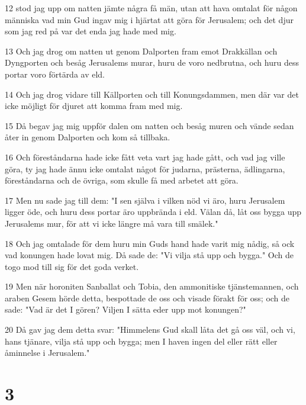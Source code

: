 \par 12 stod jag upp om natten jämte några få män, utan att hava omtalat för någon människa vad min Gud ingav mig i hjärtat att göra för Jerusalem; och det djur som jag red på var det enda jag hade med mig.
\par 13 Och jag drog om natten ut genom Dalporten fram emot Drakkällan och Dyngporten och besåg Jerusalems murar, huru de voro nedbrutna, och huru dess portar voro förtärda av eld.
\par 14 Och jag drog vidare till Källporten och till Konungsdammen, men där var det icke möjligt för djuret att komma fram med mig.
\par 15 Då begav jag mig uppför dalen om natten och besåg muren och vände sedan åter in genom Dalporten och kom så tillbaka.
\par 16 Och föreståndarna hade icke fått veta vart jag hade gått, och vad jag ville göra, ty jag hade ännu icke omtalat något för judarna, prästerna, ädlingarna, föreståndarna och de övriga, som skulle få med arbetet att göra.
\par 17 Men nu sade jag till dem: "I sen själva i vilken nöd vi äro, huru Jerusalem ligger öde, och huru dess portar äro uppbrända i eld. Välan då, låt oss bygga upp Jerusalems mur, för att vi icke längre må vara till smälek."
\par 18 Och jag omtalade för dem huru min Guds hand hade varit mig nådig, så ock vad konungen hade lovat mig. Då sade de: "Vi vilja stå upp och bygga." Och de togo mod till sig för det goda verket.
\par 19 Men när horoniten Sanballat och Tobia, den ammonitiske tjänstemannen, och araben Gesem hörde detta, bespottade de oss och visade förakt för oss; och de sade: "Vad är det I gören? Viljen I sätta eder upp mot konungen?"
\par 20 Då gav jag dem detta svar: "Himmelens Gud skall låta det gå oss väl, och vi, hans tjänare, vilja stå upp och bygga; men I haven ingen del eller rätt eller åminnelse i Jerusalem."

\chapter{3}

